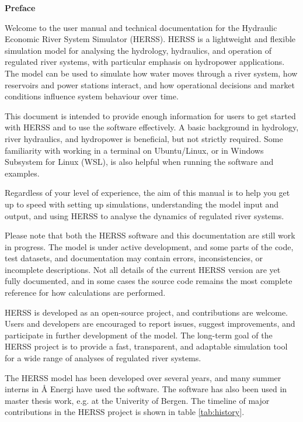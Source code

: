 \newpage
\thispagestyle{empty}

\begin{center}
	\Large\textbf{Preface}
\end{center}

\vspace{2em}

Welcome to the user manual and technical documentation for the Hydraulic Economic River System Simulator (HERSS). HERSS is a lightweight and flexible simulation model for analysing the hydrology, hydraulics, and operation of regulated river systems, with particular emphasis on hydropower applications. The model can be used to simulate how water moves through a river system, how reservoirs and power stations interact, and how operational decisions and market conditions influence system behaviour over time.

This document is intended to provide enough information for users to get started with HERSS and to use the software effectively. A basic background in hydrology, river hydraulics, and hydropower is beneficial, but not strictly required. Some familiarity with working in a terminal on Ubuntu/Linux, or in Windows Subsystem for Linux (WSL), is also helpful when running the software and examples.

Regardless of your level of experience, the aim of this manual is to help you get up to speed with setting up simulations, understanding the model input and output, and using HERSS to analyse the dynamics of regulated river systems.

Please note that both the HERSS software and this documentation are still work in progress. The model is under active development, and some parts of the code, test datasets, and documentation may contain errors, inconsistencies, or incomplete descriptions. Not all details of the current HERSS version are yet fully documented, and in some cases the source code remains the most complete reference for how calculations are performed.

HERSS is developed as an open-source project, and contributions are welcome. Users and developers are encouraged to report issues, suggest improvements, and participate in further development of the model. The long-term goal of the HERSS project is to provide a fast, transparent, and adaptable simulation tool for a wide range of analyses of regulated river systems.
\newpage 


The HERSS model has been developed over several years, and many summer interns in Å Energi have used the software. The software has also been used in master thesis work, e.g. at the Univerity of Bergen. The timeline of major contributions in the HERSS project is shown in table \ref{tab:history}. 


